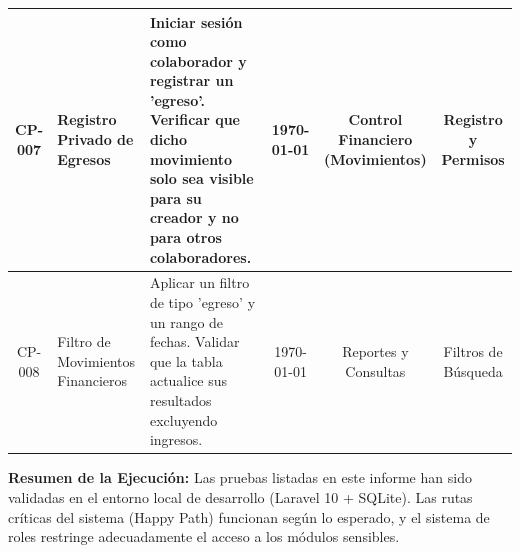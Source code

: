 \documentclass[10pt, a4paper, landscape]{article}
\begin{document}
\begin{tabularx}{\textwidth}{|c|X|X|c|c|c|}
\hline
CP-007 & Registro Privado de Egresos & Iniciar sesión como colaborador y registrar un 'egreso'. Verificar que dicho movimiento solo sea visible para su creador y no para otros colaboradores. & \today & Control Financiero (Movimientos) & Registro y Permisos \\
\hline
CP-008 & Filtro de Movimientos Financieros & Aplicar un filtro de tipo 'egreso' y un rango de fechas. Validar que la tabla actualice sus resultados excluyendo ingresos. & \today & Reportes y Consultas & Filtros de Búsqueda \\
\hline
\end{tabularx}

\vspace{1.5cm}
\noindent
\textbf{Resumen de la Ejecución:} Las pruebas listadas en este informe han sido validadas en el entorno local de desarrollo (Laravel 10 + SQLite). Las rutas críticas del sistema (Happy Path) funcionan según lo esperado, y el sistema de roles restringe adecuadamente el acceso a los módulos sensibles.
\end{document}
